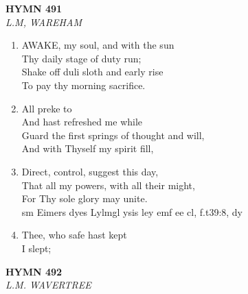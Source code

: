 \documentclass[11pt,a4paper]{article}
\begin{document}
\newpage
\begin{center}
    {\Large \textbf{HYMN 491}}
    \\
    \textit{L.M, WAREHAM}
\end{center}
\vspace{1em}

\begin{enumerate}
    \item AWAKE, my soul, and with the sun \\
        Thy daily stage of duty run; \\
        Shake off duli sloth and early rise \\
        To pay thy morning sacrifice.

    \item All preke to \\
        And hast refreshed me while \\
        Guard the first springs of thought and will, \\
        And with Thyself my spirit fill,

    \item Direct, control, suggest this day, \\
        That all my powers, with all their might, \\
        For Thy sole glory may unite. \\
        sm Eimers dyes Lylmgl ysis ley emf ee cl, f.t39:8, dy

    \item Thee, who safe hast kept \\
        I slept;

\end{enumerate}

\newpage
\begin{center}
    {\Large \textbf{HYMN 492}}
    \\
    \textit{L.M. WAVERTREE}
\end{center}
\vspace{1em}
\end{document}
